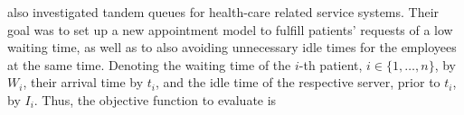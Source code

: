 \documentclass[11pt,a4paper]{article}
\begin{document}
\begin{spacing}{1.8}
%

\citet{Kuiper2015} also investigated tandem queues for health-care related service systems. Their goal was to set up a new appointment model to fulfill patients' requests of a low waiting time, as well as to also avoiding unnecessary idle times for the employees at the same time. Denoting the waiting time of the \(i\)-th patient, \(i \in \{1,\dots, n \}\), by  \(W_i\), their arrival time by \(t_i\), and the idle time of the respective server, prior to \(t_i\), by \(I_i\). Thus, the objective function to evaluate is



\end{spacing}
\end{document}
